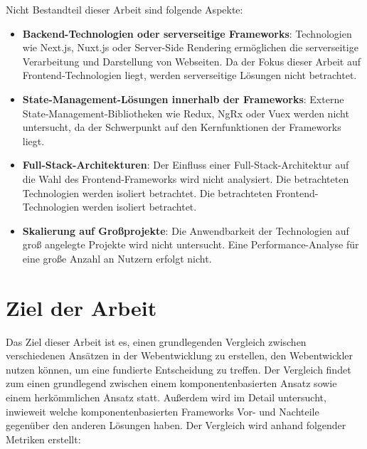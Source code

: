 \documentclass[oneside]{ausarbeitung}
\begin{document}
Nicht Bestandteil dieser Arbeit sind folgende Aspekte: 
\begin{itemize}
    \item \textbf{Backend-Technologien oder serverseitige Frameworks}:  
          Technologien wie Next.js, Nuxt.js oder Server-Side Rendering ermöglichen die serverseitige Verarbeitung und Darstellung von Webseiten.  
          Da der Fokus dieser Arbeit auf Frontend-Technologien liegt, werden serverseitige Lösungen nicht betrachtet.
    \item \textbf{State-Management-Lösungen innerhalb der Frameworks}:  
          Externe State-Management-Bibliotheken wie Redux, NgRx oder Vuex werden nicht untersucht, da 		der Schwerpunkt auf den Kernfunktionen der Frameworks liegt.
    \item \textbf{Full-Stack-Architekturen}:  
          Der Einfluss einer Full-Stack-Architektur auf die Wahl des Frontend-Frameworks wird nicht analysiert.  Die betrachteten Technologien werden isoliert betrachtet.
          Die betrachteten Frontend-Technologien werden isoliert betrachtet.
    \item \textbf{Skalierung auf Großprojekte}:  
          Die Anwendbarkeit der Technologien auf groß angelegte Projekte wird nicht untersucht.  
          Eine Performance-Analyse für eine große Anzahl an Nutzern erfolgt nicht.
\end{itemize}



\section{Ziel der Arbeit}
\label{sec:ziel}

Das Ziel dieser Arbeit ist es, einen grundlegenden Vergleich zwischen verschiedenen Ansätzen in der Webentwicklung zu erstellen, den Webentwickler nutzen können, um eine fundierte Entscheidung zu treffen. Der Vergleich findet zum einen grundlegend zwischen einem komponentenbasierten Ansatz sowie einem herkömmlichen Ansatz statt. Außerdem wird im Detail untersucht, inwieweit welche komponentenbasierten Frameworks Vor- und Nachteile gegenüber den anderen Lösungen haben. Der Vergleich wird anhand folgender Metriken erstellt:  
\end{document}
